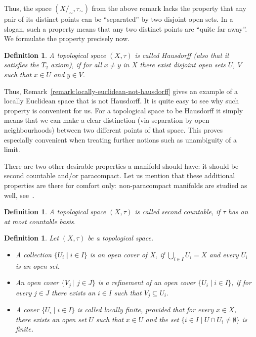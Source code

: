 \documentclass[11pt,a4paper,twoside,openany]{report}
\theoremstyle{my-theorem}
\theoremstyle{non-theorem}
\newtheorem{definition}[theorem]{Definition}
\begin{document}
		Thus, the space $(X/_\sim,\tau_\sim)$ from the above remark lacks the property that any pair of its distinct points can be ``separated'' by two disjoint open sets. In a slogan, such a property means that any two distinct points are ``quite far away''. We formulate the property precisely now.
		\begin{definition}
			A topological space $(X, \tau)$ is called \emph{Hausdorff} (also that it \emph{satisfies the $T_2$ axiom}), if for all $x \neq y$ in $X$ there exist disjoint open sets $U$, $V$ such that $x \in U$ and $y \in V$.
		\end{definition}
	
		Thus, Remark~\ref{remark:locally-euclidean-not-hausdorff} gives an example of a locally Euclidean space that is not Hausdorff. It is quite easy to see why such property is convenient for us. For a topological space to be Hausdorff it simply means that we can make a clear distinction (via separation by open neighbourhoods) between two different points of that space. This proves especially convenient when treating further notions such as unambiguity of a limit.
		
		There are two other desirable properties a manifold should have: it should be second countable and/or paracompact. Let us mention that these additional properties are there for comfort only: non-paracompact manifolds are studied as well, see~\cite{gauld:nonmetrisable-manifolds}.
		\begin{definition}
			A topological space $(X, \tau)$ is called \emph{second countable}, if $\tau$ has an at most countable basis.
		\end{definition}

		\begin{definition}
			Let $(X,\tau)$ be a topological space.
			\begin{itemize}
				\item A collection $\{U_i \mid i \in I\}$ is an \emph{open cover} of $X$, if $\bigcup_{i \in I} U_i = X$ and every $U_i$ is an open set.
				\item An open cover $\{V_j \mid j \in J\}$ is a \emph{refinement} of an open cover $\{U_i \mid i \in I\}$, if for every $j \in J$ there exists an $i \in I$ such that $V_j \subseteq U_i$.
				\item A cover $\{U_i \mid i \in I\}$ is called \emph{locally finite}, provided that for every $x \in X$, there exists an open set $U$ such that $x \in U$ and the set $\{i \in I \mid U \cap U_i \neq \emptyset\}$ is finite.
			\end{itemize}
		\end{definition}
\end{document}
